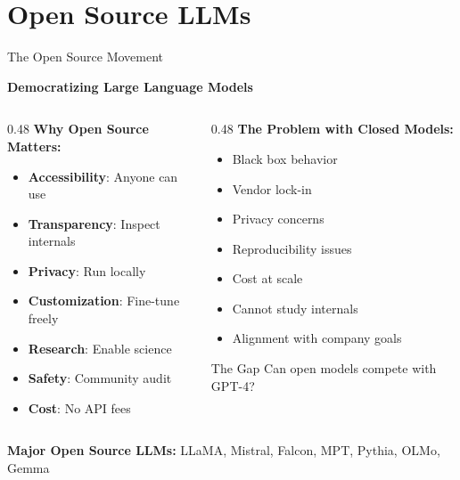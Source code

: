 \documentclass[aspectratio=169]{beamer}
\begin{document}
\section{Open Source LLMs}

\begin{frame}{The Open Source Movement 🦙}
\begin{center}
\Large
\textbf{Democratizing Large Language Models}
\end{center}

\vspace{1em}

\begin{columns}[T]
\begin{column}{0.48\textwidth}
\textbf{Why Open Source Matters:}
\begin{itemize}
    \item \textbf{Accessibility}: Anyone can use
    \item \textbf{Transparency}: Inspect internals
    \item \textbf{Privacy}: Run locally
    \item \textbf{Customization}: Fine-tune freely
    \item \textbf{Research}: Enable science
    \item \textbf{Safety}: Community audit
    \item \textbf{Cost}: No API fees
\end{itemize}
\end{column}

\begin{column}{0.48\textwidth}
\textbf{The Problem with Closed Models:}
\begin{itemize}
    \item Black box behavior
    \item Vendor lock-in
    \item Privacy concerns
    \item Reproducibility issues
    \item Cost at scale
    \item Cannot study internals
    \item Alignment with company goals
\end{itemize}

\vspace{0.5em}

\begin{alertblock}{The Gap}
Can open models compete with GPT-4?
\end{alertblock}
\end{column}
\end{columns}

\vspace{0.5em}

\textbf{Major Open Source LLMs:} LLaMA, Mistral, Falcon, MPT, Pythia, OLMo, Gemma
\end{frame}
\end{document}
